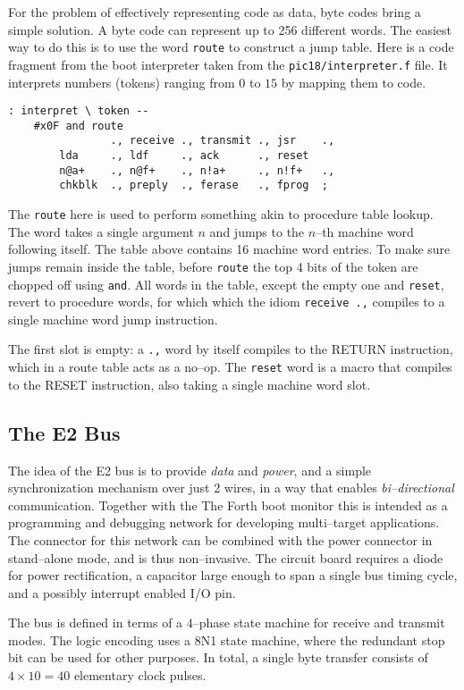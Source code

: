 \documentclass[12pt]{article}
\begin{document}
For the problem of effectively representing code as data, byte codes
bring a simple solution. A byte code can represent up to 256 different
words. The easiest way to do this is to use the word \verb|route| to
construct a jump table. Here is a code fragment from the boot
interpreter taken from the \verb|pic18/interpreter.f| file. It
interprets numbers (tokens) ranging from $0$ to $15$ by mapping them
to code.
\begin{verbatim}
: interpret \ token -- 
    #x0F and route
                ., receive ., transmit ., jsr    .,
        lda     ., ldf     ., ack      ., reset
        n@a+    ., n@f+    ., n!a+     ., n!f+   .,    
        chkblk  ., preply  ., ferase   ., fprog  ; 
\end{verbatim}

The \verb|route| here is used to perform something akin to procedure
table lookup.  The word takes a single argument $n$ and jumps to the
$n$--th machine word following itself.  The table above contains 16
machine word entries. To make sure jumps remain inside the table,
before \verb|route| the top 4 bits of the token are chopped off using
\verb|and|. All words in the table, except the empty one and
\verb|reset|, revert to procedure words, for which which the idiom
\verb|receive .,| compiles to a single machine word jump instruction.

The first slot is empty: a \verb|.,| word by itself compiles to the
RETURN instruction, which in a route table acts as a no--op. The
\verb|reset| word is a macro that compiles to the RESET instruction,
also taking a single machine word slot. 



\subsection{The E2 Bus}

The idea of the E2 bus is to provide \emph{data} and \emph{power}, and
a simple synchronization mechanism over just 2 wires, in a way that
enables \emph{bi--directional} communication. Together with the The Forth
boot monitor this is intended as a programming and debugging network
for developing multi--target applications. The connector for this
network can be combined with the power connector in stand--alone mode,
and is thus non--invasive. The circuit board requires a diode for
power rectification, a capacitor large enough to span a single bus
timing cycle, and a possibly interrupt enabled I/O pin.

The bus is defined in terms of a $4$--phase state machine for receive
and transmit modes. The logic encoding uses a 8N1 state machine, where
the redundant stop bit can be used for other purposes. In total, a
single byte transfer consists of $4 \times 10 = 40$ elementary clock
pulses.
\end{document}
